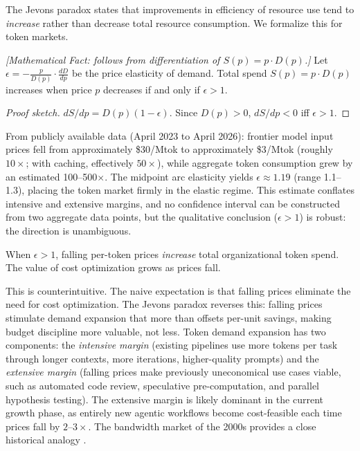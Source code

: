 The Jevons paradox \citep{jevons1865} states that improvements in efficiency of resource use tend to \emph{increase} rather than decrease total resource consumption. We formalize this for token markets.

\begin{theorem}
\label{thm:econ-jevons}
\emph{[Mathematical Fact: follows from differentiation of $S(p) = p \cdot D(p)$.]}
Let $\epsilon = -\frac{p}{D(p)} \cdot \frac{dD}{dp}$ be the price elasticity of demand. Total spend $S(p) = p \cdot D(p)$ increases when price $p$ decreases if and only if $\epsilon > 1$.
\end{theorem}

\begin{proof}[Proof sketch]
$dS/dp = D(p)(1 - \epsilon)$. Since $D(p) > 0$, $dS/dp < 0$ iff $\epsilon > 1$.
\end{proof}

From publicly available data (April 2023 to April 2026): frontier model input prices fell from approximately \$30/Mtok to approximately \$3/Mtok (roughly $10\times$; with caching, effectively $50\times$), while aggregate token consumption grew by an estimated 100--500$\times$. The midpoint arc elasticity yields $\epsilon \approx 1.19$ (range 1.1--1.3), placing the token market firmly in the elastic regime. This estimate conflates intensive and extensive margins, and no confidence interval can be constructed from two aggregate data points, but the qualitative conclusion ($\epsilon > 1$) is robust: the direction is unambiguous.

\begin{corollary}
\label{cor:econ-jevons}
When $\epsilon > 1$, falling per-token prices \emph{increase} total organizational token spend. The value of cost optimization grows as prices fall.
\end{corollary}

This is counterintuitive. The naive expectation is that falling prices eliminate the need for cost optimization. The Jevons paradox reverses this: falling prices stimulate demand expansion that more than offsets per-unit savings, making budget discipline more valuable, not less. Token demand expansion has two components: the \emph{intensive margin} (existing pipelines use more tokens per task through longer contexts, more iterations, higher-quality prompts) and the \emph{extensive margin} (falling prices make previously uneconomical use cases viable, such as automated code review, speculative pre-computation, and parallel hypothesis testing). The extensive margin is likely dominant in the current growth phase, as entirely new agentic workflows become cost-feasible each time prices fall by $2$--$3\times$. The bandwidth market of the 2000s provides a close historical analogy \citep{sorrell2009}.

